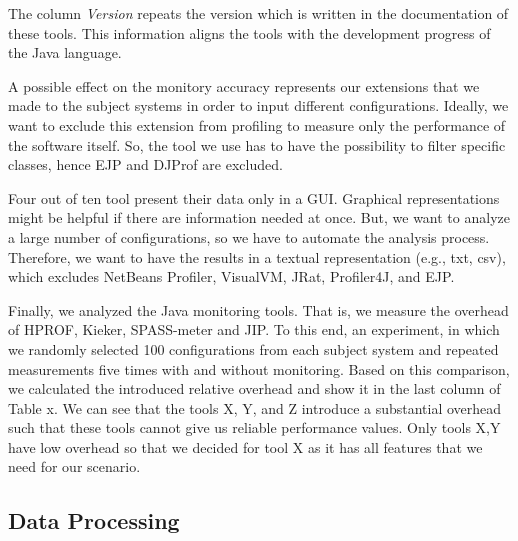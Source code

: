 The column \textit{Version} repeats the version which is written in the documentation of these tools. This information aligns the tools with the development progress of the Java language.

A possible effect on the monitory accuracy represents our extensions that we made to the subject systems in order to input different configurations. Ideally, we want to exclude this extension from profiling to measure only the performance of the software itself. So, the tool we use has to have the possibility to filter specific classes, hence EJP and DJProf are excluded.

Four out of ten tool present their data only in a \ac{GUI}. Graphical representations might be helpful if there are information needed at once. But, we want to analyze a large number of configurations, so we have to automate the analysis process. Therefore, we want to have the results in a textual representation (e.g., txt, csv), which excludes NetBeans Profiler, VisualVM, JRat, Profiler4J, and EJP. 

Finally, we analyzed the Java monitoring tools. That is, we measure the overhead of HPROF, Kieker, SPASS-meter and JIP. To this end, an experiment, in which we randomly selected 100 configurations from each subject system and repeated measurements five times with and without monitoring. Based on this comparison, we calculated the introduced relative overhead and show it in the last column of Table x.
We can see that the tools X, Y, and Z introduce a substantial overhead such that these tools cannot give us reliable performance values. Only tools X,Y have low overhead so that we decided for tool X as it has all features that we need for our scenario.


\subsection{Data Processing}
\label{data_prozessing}

